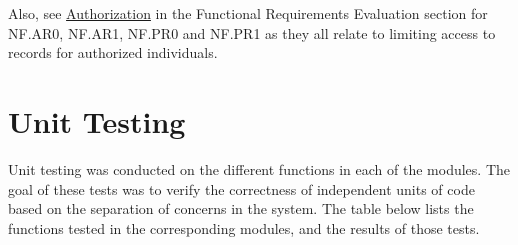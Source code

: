 \documentclass[12pt, titlepage]{article}
\begin{document}
Also, see \hyperlink{Auth}{Authorization} in the Functional Requirements Evaluation section for NF.AR0, NF.AR1, NF.PR0 and NF.PR1 as they all relate to limiting access to records for authorized individuals.
  


\section{Unit Testing}

Unit testing was conducted on the different functions in each of the modules. The goal of these tests was to verify the correctness of independent units of code based on the separation of concerns in the system. The table below lists the functions tested in the corresponding modules, and the results of those tests.
\end{document}
